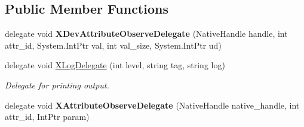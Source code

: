 \subsection*{Public Member Functions}
\begin{DoxyCompactItemize}
\item 
\mbox{\label{class_ximmerse_1_1_input_system_1_1_x_device_plugin_ab63dcd3c4df31a722846fa7d5a206274}} 
delegate void {\bfseries X\+Dev\+Attribute\+Observe\+Delegate} (Native\+Handle handle, int attr\+\_\+id, System.\+Int\+Ptr val, int val\+\_\+size, System.\+Int\+Ptr ud)
\item 
delegate void \mbox{\hyperlink{class_ximmerse_1_1_input_system_1_1_x_device_plugin_ad3e594d2625a689603878102ad019899}{X\+Log\+Delegate}} (int level, string tag, string log)
\begin{DoxyCompactList}\small\item\em Delegate for printing output. \end{DoxyCompactList}\item 
\mbox{\label{class_ximmerse_1_1_input_system_1_1_x_device_plugin_a89daec82446f8b3031fc2eb3a38076bd}} 
delegate void {\bfseries X\+Attribute\+Observe\+Delegate} (Native\+Handle native\+\_\+handle, int attr\+\_\+id, Int\+Ptr param)
\end{DoxyCompactItemize}
